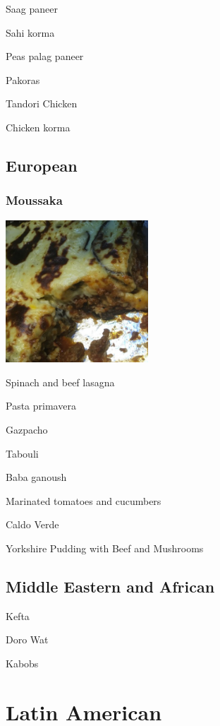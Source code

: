 \documentclass[
]{book}
\begin{document}
Saag paneer

Sahi korma

Peas palag paneer

Pakoras

Tandori Chicken

Chicken korma

\hypertarget{european}{%
\section*{European}\label{european}}

\hypertarget{moussaka}{%
\subsection*{Moussaka}\label{moussaka}}

\includegraphics[width=0.4\textwidth,height=\textheight]{moussaka_small.jpg}

Spinach and beef lasagna

Pasta primavera

Gazpacho

Tabouli

Baba ganoush

Marinated tomatoes and cucumbers

Caldo Verde

Yorkshire Pudding with Beef and Mushrooms

\hypertarget{middle-eastern-and-african}{%
\section*{Middle Eastern and African}\label{middle-eastern-and-african}}

Kefta

Doro Wat

Kabobs

\hypertarget{latin-american}{%
\chapter*{Latin American}\label{latin-american}}
\end{document}

